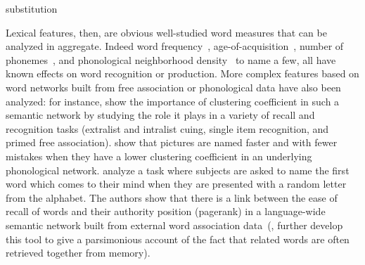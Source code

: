  substitution 

\begin{new}

Lexical features, then, are obvious well-studied word measures that can be analyzed in aggregate.
Indeed word frequency~\citep[see][for a review]{yonelinas_nature_2002}, age-of-acquisition~\citep{zevin_age_2002}, number of phonemes~\citep[see for instance][]{rey_phoneme_1998,nickels_dissociating_2004}, and phonological neighborhood density~\citep{garlock_age--acquisition_2001} to name a few, all have known effects on word recognition or production.
More complex features based on word networks built from free association or phonological data have also been analyzed:
\citet{nelson_how_2013} for instance, show the importance of clustering coefficient in such a semantic network by studying the role it plays in a variety of recall and recognition tasks (extralist and intralist cuing, single item recognition, and primed free association).
\citet{chan_network_2010} show that pictures are named faster and with fewer mistakes when they have a lower clustering coefficient in an underlying phonological network.
\citet{griffiths_google_2007} analyze a task where subjects are asked to name the first word which comes to their mind when they are presented with a random letter from the alphabet.
The authors show that there is a link between the ease of recall of words and their authority position (pagerank) in a language-wide semantic network built from external word association data~(\citealp{austerweil_human_2012}, further develop this tool to give a parsimonious account of the fact that related words are often retrieved together from memory).

\end{new}

